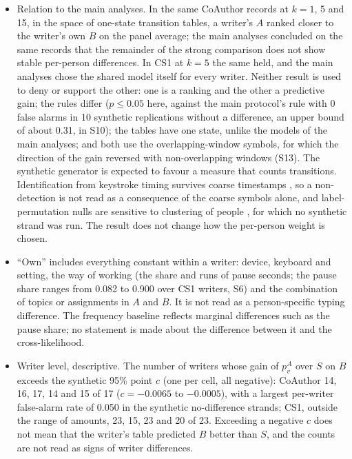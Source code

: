 \documentclass[10pt]{article}
\begin{document}
\begin{itemize}
\item Relation to the main analyses. In the same CoAuthor records at $k=1$, 5 and 15, in the space of one-state transition tables, a writer's $A$ ranked closer to the writer's own $B$ on the panel average; the main analyses concluded on the same records that the remainder of the strong comparison does not show stable per-person differences. In CS1 at $k=5$ the same held, and the main analyses chose the shared model itself for every writer. Neither result is used to deny or support the other: one is a ranking and the other a predictive gain; the rules differ ($p\le0.05$ here, against the main protocol's rule with 0 false alarms in 10 synthetic replications without a difference, an upper bound of about 0.31, in S10); the tables have one state, unlike the models of the main analyses; and both use the overlapping-window symbols, for which the direction of the gain reversed with non-overlapping windows (S13). The synthetic generator is expected to favour a measure that counts transitions. Identification from keystroke timing survives coarse timestamps \citep{Dehling2024}, so a non-detection is not read as a consequence of the coarse symbols alone, and label-permutation nulls are sensitive to clustering of people \citep{Wang2021}, for which no synthetic strand was run. The result does not change how the per-person weight is chosen.
\item ``Own'' includes everything constant within a writer: device, keyboard and setting, the way of working (the share and runs of pause seconds; the pause share ranges from 0.082 to 0.900 over CS1 writers, S6) and the combination of topics or assignments in $A$ and $B$. It is not read as a person-specific typing difference. The frequency baseline reflects marginal differences such as the pause share; no statement is made about the difference between it and the cross-likelihood.
\item Writer level, descriptive. The number of writers whose gain of $p^A_v$ over $S$ on $B$ exceeds the synthetic 95\% point $c$ (one per cell, all negative): CoAuthor 14, 16, 17, 14 and 15 of 17 ($c=-0.0065$ to $-0.0005$), with a largest per-writer false-alarm rate of 0.050 in the synthetic no-difference strands; CS1, outside the range of amounts, 23, 15, 23 and 20 of 23. Exceeding a negative $c$ does not mean that the writer's table predicted $B$ better than $S$, and the counts are not read as signs of writer differences.
\end{itemize}



\end{document}
